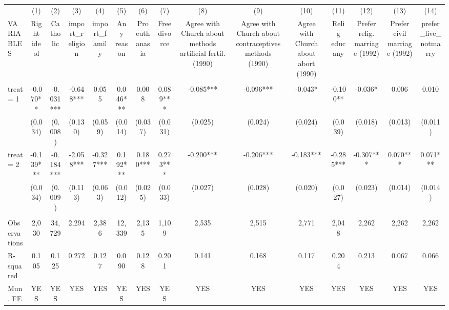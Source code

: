 \begin{tabular}{lcccccccccccccc} \hline
 & (1) & (2) & (3) & (4) & (5) & (6) & (7) & (8) & (9) & (10) & (11) & (12) & (13) & (14) \\
VARIABLES & Right ideol & Catholic & import\_religion & import\_family & Any reason & Pro euthanasia & Free divorce & Agree with Church about methods artificial fertil. (1990) & Agree with Church about contraceptives methods (1990) & Agree with Church about abort (1990) & Relig educ any & Prefer relig. marriage (1992) & Prefer civil marriage (1992) & prefer\_live\_notmarry \\ \hline
 &  &  &  &  &  &  &  &  &  &  &  &  &  &  \\
treat = 1 & -0.070** & -0.031*** & -0.648*** & 0.055 & 0.046*** & 0.008 & 0.089*** & -0.085*** & -0.096*** & -0.043* & -0.100** & -0.036* & 0.006 & 0.010 \\
 & (0.034) & (0.008) & (0.130) & (0.059) & (0.014) & (0.037) & (0.031) & (0.025) & (0.024) & (0.024) & (0.039) & (0.018) & (0.013) & (0.011) \\
treat = 2 & -0.139*** & -0.184*** & -2.058*** & -0.327*** & 0.192*** & 0.180*** & 0.273*** & -0.200*** & -0.206*** & -0.183*** & -0.285*** & -0.307*** & 0.070*** & 0.071*** \\
 & (0.034) & (0.009) & (0.113) & (0.063) & (0.012) & (0.025) & (0.033) & (0.027) & (0.028) & (0.020) & (0.027) & (0.023) & (0.014) & (0.014) \\
 &  &  &  &  &  &  &  &  &  &  &  &  &  &  \\
Observations & 2,030 & 34,729 & 2,294 & 2,386 & 12,339 & 2,135 & 1,109 & 2,535 & 2,515 & 2,771 & 2,048 & 2,262 & 2,262 & 2,262 \\
R-squared & 0.105 & 0.125 & 0.272 & 0.127 & 0.090 & 0.128 & 0.201 & 0.141 & 0.168 & 0.117 & 0.204 & 0.213 & 0.067 & 0.066 \\
 Mun. FE & YES & YES & YES & YES & YES & YES & YES & YES & YES & YES & YES & YES & YES & YES \\ \hline
\end{tabular}
